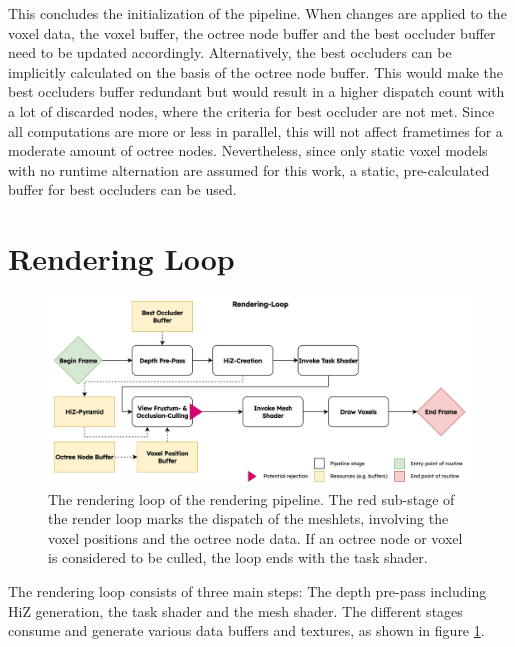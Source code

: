 
\noindent
This concludes the initialization of the pipeline. When changes are applied to the voxel data, the voxel buffer,
the octree node buffer and the best occluder buffer need to be updated accordingly. Alternatively, the best 
occluders can be implicitly calculated on the basis of the octree node buffer. This would make the best 
occluders buffer redundant but would result in a higher dispatch count with a lot of discarded nodes, 
where the criteria for best occluder are not met. Since all computations are more or less in parallel, this 
will not affect frametimes for a moderate amount of octree nodes. Nevertheless, since only static voxel models with 
no runtime alternation are assumed for this work, a static, pre-calculated buffer for best occluders can be used.


\section{Rendering Loop} \label{sec-rendering-loop}

\begin{figure}[h]
    \centering
    \includegraphics[width=\linewidth]{images/graphics/rendering-loop.jpg}
    \caption{The rendering loop of the rendering pipeline. The red sub-stage of the render loop marks the dispatch 
    of the meshlets, involving the voxel positions and the octree node data. If an octree node or voxel is considered 
    to be culled, the loop ends with the task shader.}
    \label{fig:pipeline-loop}
\end{figure}

\noindent
The rendering loop consists of three main steps: The depth pre-pass including \ac{HiZ} generation, the 
task shader and the mesh shader. The different stages consume and generate various data buffers 
and textures, as shown in figure \ref{fig:pipeline-loop}. 

